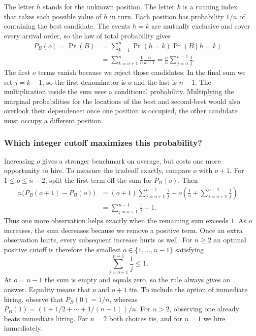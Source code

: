 \documentclass[a4paper,10pt]{article}
\begin{document}
The letter $h$ stands for the unknown position. The letter $k$ is a running
index that takes each possible value of $h$ in turn. Each position has
probability $1/n$ of containing the best candidate. The events $h=k$ are
mutually exclusive and cover every arrival order, so the law of total
probability gives
\begin{align*}
  P_B(o)=\Pr(B)
    &=\sum_{k=1}^{n}\Pr(h=k)\Pr(B\mid h=k)\\
    &=\sum_{k=o+1}^{n}\frac1n\frac{o}{k-1}
     =\boxed{\frac{o}{n}\sum_{j=o}^{n-1}\frac1j}.
\end{align*}
The first $o$ terms vanish because we reject those candidates. In the final
sum we set $j=k-1$, so the first denominator is $o$ and the last is $n-1$.
The multiplication inside the sum uses a conditional probability. Multiplying
the marginal probabilities for the locations of the best and second-best
would also overlook their dependence: once one position is occupied, the
other candidate must occupy a different position.

\subsubsection*{Which integer cutoff maximizes this probability?}
Increasing $o$ gives a stronger benchmark on average, but costs one more
opportunity to hire. To measure the tradeoff exactly, compare $o$ with $o+1$.
For $1\le o\le n-2$, split the first term off the sum for $P_B(o)$. Then
\begin{align*}
 n\bigl(P_B(o+1)-P_B(o)\bigr)
 &= (o+1)\sum_{j=o+1}^{n-1}\frac1j
    -o\left(\frac1o+\sum_{j=o+1}^{n-1}\frac1j\right)\\
 &=\sum_{j=o+1}^{n-1}\frac1j-1.
\end{align*}
Thus one more observation helps exactly when the remaining sum exceeds $1$.
As $o$ increases, the sum decreases because we remove a positive term.
Once an extra observation hurts, every subsequent increase hurts as well.
For $n\ge2$ an optimal positive cutoff is therefore the smallest
$o\in\{1,\ldots,n-1\}$ satisfying
\[
   \boxed{\displaystyle\sum_{j=o+1}^{n-1}\frac1j\le1}.
\]
At $o=n-1$ the sum is empty and equals zero, so the rule always gives an
answer. Equality means that $o$ and $o+1$ tie. To include the option of
immediate hiring, observe that $P_B(0)=1/n$, whereas
$P_B(1)=(1+1/2+\cdots+1/(n-1))/n$. For $n>2$, observing one already beats
immediate hiring. For $n=2$ both choices tie, and for $n=1$ we hire immediately.
\end{document}
